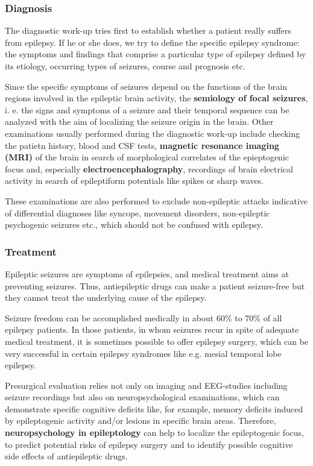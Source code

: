 \documentclass[12pt,article,oneside,a4paper]{memoir}
\begin{document}
\subsubsection{Diagnosis}

The diagnostic work-up tries first to establish whether a patient really suffers from epilepsy. If he or she does, we try to define the specific epilepsy syndrome: the symptoms and findings that comprise a particular type of epilepsy defined by its etiology, occurring types of seizures, course and prognosis etc.

Since the specific symptoms of seizures depend on the functions of the brain regions involved in the epileptic brain activity, the \textbf{semiology of focal seizures}, i. e. the signs and symptoms of a seizure and their temporal sequence can be analyzed with the aim of localizing the seizure origin in the brain.
Other examinations usually performed during the diagnostic work-up include checking the patietn history, blood and CSF tests, \textbf{magnetic resonance imaging (MRI)} of the brain in search of morphological correlates of the epieptogenic focus and, especially \textbf{electroencephalography}, recordings of brain electrical activity in search of epileptiform potentials like spikes or sharp waves.

These examinations are also performed to exclude non-epileptic attacks indicative of differential diagnoses like syncope, movement disorders, non-epileptic psychogenic seizures etc., which should not be confused with epilepsy.

\subsubsection{Treatment}

Epileptic seizures are symptoms of epilepsies, and medical treatment aims at preventing seizures. Thus, antiepileptic drugs can make a patient seizure-free but they cannot treat the underlying cause of the epilepsy. 

Seizure freedom can be accomplished medically in about 60\% to 70\% of all epilepsy patients. In those patients, in whom seizures recur in spite of adequate medical treatment, it is sometimes possible to offer epilepsy surgery, which can be very successful in certain epilepsy syndromes like e.g. mesial temporal lobe epilepsy.

Presurgical evaluation relies not only on imaging and EEG-studies including seizure recordings but also on neuropsychological examinations, which can demonstrate specific cognitive deficits like, for example, memory deficits induced by epileptogenic activity and/or lesions in specific brain areas. Therefore, \textbf{neuropsychology in epileptology} can help to localize the epileptogenic focus, to predict potential risks of epilepsy surgery and to identify possible cognitive side effects of antiepileptic drugs.
\end{document}
